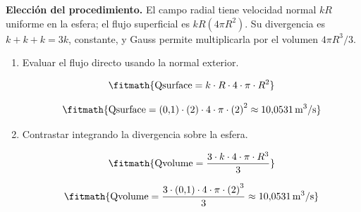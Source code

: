 \noindent\textbf{Elección del procedimiento.} El campo radial tiene velocidad normal $kR$ uniforme en la esfera; el flujo superficial es $kR(4\pi R^2)$. Su divergencia es $k+k+k=3k$, constante, y Gauss permite multiplicarla por el volumen $4\pi R^3/3$.

\begin{enumerate}

\item Evaluar el flujo directo usando la normal exterior.

\[\fitmath{\mathrm{Qsurface}=k\cdot R\cdot 4\cdot \pi\cdot {R}^{2}}\]

\[\fitmath{\mathrm{Qsurface}=(0{,}1)\cdot (2)\cdot 4\cdot \pi\cdot {(2)}^{2}\approx 10{,}0531\,\mathrm{m^{3}/s}}\]

\item Contrastar integrando la divergencia sobre la esfera.

\[\fitmath{\mathrm{Qvolume}=\frac{3\cdot k\cdot 4\cdot \pi\cdot {R}^{3}}{3}}\]

\[\fitmath{\mathrm{Qvolume}=\frac{3\cdot (0{,}1)\cdot 4\cdot \pi\cdot {(2)}^{3}}{3}\approx 10{,}0531\,\mathrm{m^{3}/s}}\]

\end{enumerate}
